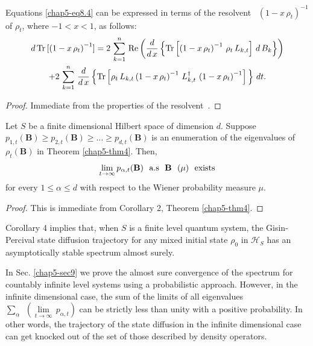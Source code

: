 \begin{coro} %
Equations \eqref{chap5-eq8.4} can be expressed in terms of the resolvent~\cite{key44} $\left(1-x\, \rho_t\right)^{-1}$ of $\rho_t$, where $-1 < x < 1$, as follows: 
\begin{multline}
d\, {\rm Tr}\,[\left(1-x\, \rho_t\right)^{-1}]= 2\, \sum_{k=1}^{n}\, {\rm Re}\left(\frac{d}{d\,x}\left\{{\rm Tr}\left[\left(1-x\, \rho_t\right)^{-1}\, \rho_t\, L_{k,t}\right]\, d\, B_{k}\right\}\right) \\ 
+2\, \sum_{k=1}^{n}\, \frac{d}{d\,x}\left\{{\rm Tr}\left[ \rho_t\, L_{k,t}\left(1-x\, \rho_t\right)^{-1}\, L_{k,t}^\dag\, \left(1-x\, \rho_t\right)^{-1}  \right]\, \right\}\, dt. \label{chap5-eq8.9}
\end{multline}
\end{coro}
     
\begin{proof}
Immediate from the properties of the resolvent~\cite{key44}.
\end{proof}
\begin{coro} %
Let $S$ be a finite dimensional Hilbert space of dimension $d$.  Suppose $p_{1,t}(\mathbf{B})\geq p_{2,t}(\mathbf{B})\geq \ldots \geq p_{d,t}(\mathbf{B})$ is an enumeration of the eigenvalues of $\rho_t(\mathbf{B})$ in Theorem \ref{chap5-thm4}. Then, 
$$
\underset{t\rightarrow\infty}{\lim}\, p_{\alpha,t}(\mathbf{B})\ \ {\rm a.s}\ \ \mathbf{B}\ \ (\mu)\ \ {\rm exists}
$$ 
for every $1\leq \alpha\leq d$ with respect to the Wiener probability measure $\mu$. 
\end{coro}
\begin{proof}
This is immediate from Corollary 2, Theorem \ref{chap5-thm4}.
\end{proof}

\begin{remark}
Corollary 4 implies that, when $S$ is a finite level quantum system, the Gisin-Percival state diffusion trajectory for any mixed initial state $\rho_0$ in $\mathcal{H}_S$ has an asymptotically stable spectrum  almost surely. 
\end{remark}

In Sec. \ref{chap5-sec9} we prove the almost sure convergence of the spectrum for countably infinite level systems using a probabilistic approach. However, in the infinite dimensional case, the sum of the limits of all eigenvalues ${\displaystyle\sum_{\alpha}}\ \ \left(\underset{t\rightarrow\infty}{\lim}\,  p_{\alpha,t}\right)$ can be strictly less than unity with a positive probability. In other words, the trajectory of the state diffusion in the infinite dimensional case can get knocked out of the set of  those described by  density operators. 


